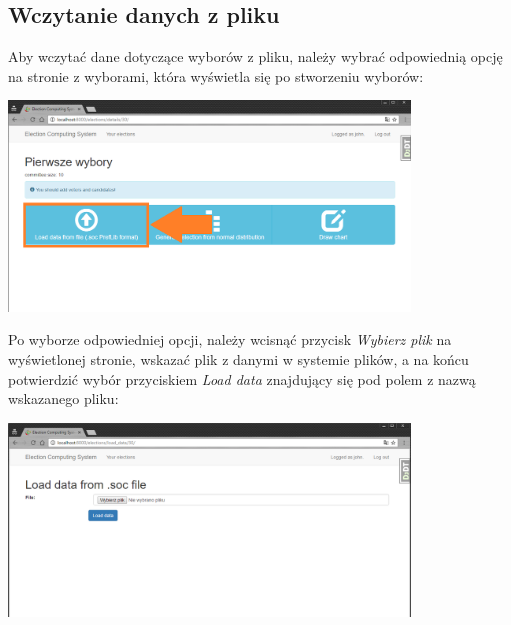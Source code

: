 \documentclass[pdflatex,11pt]{../aghdoc_version2}
\begin{document}
\subsection{Wczytanie danych z pliku}
\label{subsec:wczytaniezpliku}

Aby wczytać dane dotyczące wyborów z pliku, należy wybrać odpowiednią opcję na stronie z wyborami, która wyświetla się po stworzeniu wyborów: \\

\begin{center}
\includegraphics[width=0.8\textwidth]{pics/load_data_from_file_button.png}
\end{center}


\vspace{\baselineskip}
\vspace{\baselineskip}
\vspace{\baselineskip}
Po wyborze odpowiedniej opcji, należy wcisnąć przycisk \textit{Wybierz plik} na wyświetlonej stronie, wskazać plik z danymi w systemie plików, a na końcu potwierdzić wybór przyciskiem \textit{Load data} znajdujący się pod polem z nazwą wskazanego pliku: 

\newpage

\begin{center}
\includegraphics[width=0.8\textwidth]{pics/load-from-file.png}
\end{center}
\end{document}
